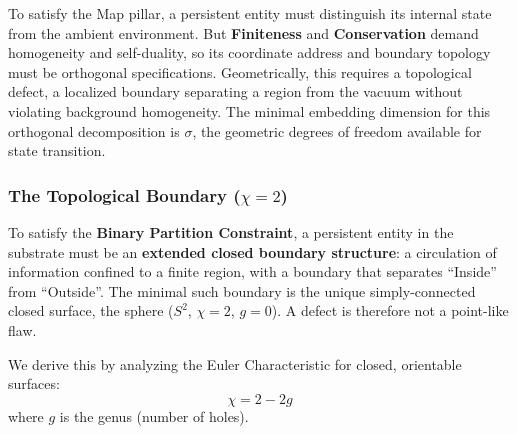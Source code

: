 To satisfy the Map pillar, a persistent entity must distinguish its internal state from the ambient environment. But \textbf{Finiteness} and \textbf{Conservation} demand homogeneity and self-duality, so its coordinate address and boundary topology must be orthogonal specifications. Geometrically, this requires a topological defect, a localized boundary separating a region from the vacuum without violating background homogeneity. The minimal embedding dimension for this orthogonal decomposition is $\sigma$, the geometric degrees of freedom available for state transition.

\subsubsection{The Topological Boundary (\texorpdfstring{$\chi=2$}{chi=2})}
\label{sec:topological_boundary}

To satisfy the \textbf{Binary Partition Constraint}, a persistent entity in the substrate must be an \textbf{extended closed boundary structure}: a circulation of information confined to a finite region, with a boundary that separates ``Inside'' from ``Outside''. The minimal such boundary is the unique simply-connected closed surface, the sphere ($S^2$, $\chi = 2$, $g = 0$). A defect is therefore not a point-like flaw.

We derive this by analyzing the Euler Characteristic for closed, orientable surfaces:
\begin{equation}
    \chi = 2 - 2g
\end{equation}
where $g$ is the genus (number of holes).

